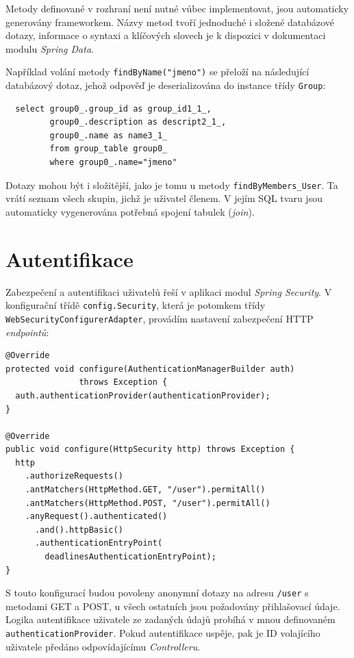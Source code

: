 \documentclass[thesis=B,czech]{FITthesis}[2012/06/26]
\begin{document}
	Metody definované v rozhraní není nutné vůbec implementovat, jsou automaticky generovány frameworkem. Názvy metod tvoří jednoduché i složené databázové dotazy, informace o syntaxi a klíčových slovech je k dispozici v dokumentaci modulu \textit{Spring Data}. \cite{dao-query-methods}
	
	Například volání metody \texttt{findByName("jmeno")} se přeloží na následující databázový dotaz, jehož odpověď je deserializována do instance třídy \texttt{Group}:
	\begin{Verbatim}
  select group0_.group_id as group_id1_1_, 
         group0_.description as descript2_1_, 
         group0_.name as name3_1_ 
         from group_table group0_ 
         where group0_.name="jmeno"
	\end{Verbatim}
	
	Dotazy mohou být i složitější, jako je tomu u metody \texttt{findByMembers\_User}. Ta vrátí seznam všech skupin, jichž je uživatel členem. V jejím  SQL tvaru jsou automaticky vygenerována potřebná spojení tabulek (\textit{join}).
	
	\section{Autentifikace}
		Zabezpečení a autentifikaci uživatelů řeší v aplikaci modul \textit{Spring Security}. \cite{spring-security} V konfigurační třídě \texttt{config.Security}, která je potomkem třídy \texttt{WebSecurityConfigurerAdapter}, provádím nastavení zabezpečení HTTP \textit{endpointů}:
		\begin{Verbatim}
@Override
protected void configure(AuthenticationManagerBuilder auth) 
               throws Exception {
  auth.authenticationProvider(authenticationProvider);
}
		
@Override
public void configure(HttpSecurity http) throws Exception {
  http
    .authorizeRequests()
    .antMatchers(HttpMethod.GET, "/user").permitAll()
    .antMatchers(HttpMethod.POST, "/user").permitAll()
    .anyRequest().authenticated()
      .and().httpBasic()
      .authenticationEntryPoint(
        deadlinesAuthenticationEntryPoint);
}
		\end{Verbatim}
	
		S touto konfigurací budou povoleny anonymní dotazy na adresu \texttt{/user} s metodami GET a POST, u všech ostatních jsou požadovány přihlašovací údaje. Logika autentifikace uživatele ze zadaných údajů probíhá v mnou definovaném \texttt{authenticationProvider}. Pokud autentifikace uspěje, pak je ID volajícího uživatele předáno odpovídajícímu \textit{Controlleru}.
	
\end{document}
